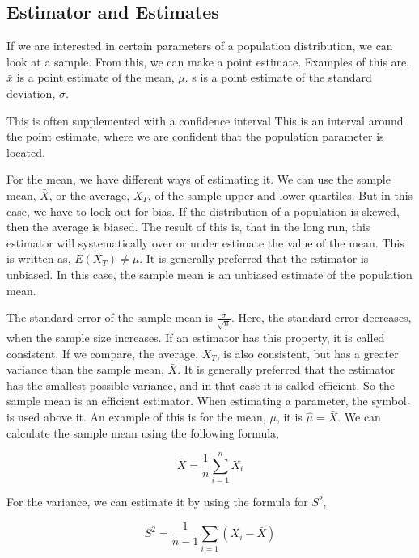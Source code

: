 \subsection{Estimator and Estimates}
If we are interested in certain parameters of a population distribution, we can look at a sample. From this, we can make a point estimate. 
\newline
Examples of this are, 
\newline
$\bar{x}$ is a point estimate of the mean, $\mu$.
\newline
s is a point estimate of the standard deviation, $\sigma$.
\newline

\noindent This is often supplemented with a confidence interval
\newline
This is an interval around the point estimate, where we are confident that the population parameter is located.
\newline

\noindent For the mean, we have different ways of estimating it. We can use the sample mean, $\bar{X}$, or the average, $X_T$, of the sample upper and lower quartiles. 
But in this case, we have to look out for bias. If the distribution of a population is skewed, then the average is biased. The result of this is, that in the long run, this estimator will systematically over or under estimate the value of the mean. This is written as,
\newline
$E(X_T) \neq \mu$.
\newline
It is generally preferred that the estimator is unbiased. In this case, the sample mean is an unbiased estimate of the population mean.
\newline

\noindent The standard error of the sample mean is $\frac{\sigma}{\sqrt{n}}$. Here, the standard error decreases, when the sample size increases. If an estimator has this property, it is called consistent. If we compare, the average, $X_T$, is also consistent, but has a greater variance than the sample mean, $\bar{X}$. 
\newline
It is generally preferred that the estimator has the smallest possible variance, and in that case it is called efficient. So the sample mean is an efficient estimator.
\newline
When estimating a parameter, the symbol $\hat{}$ is used above it. An example of this is for the mean, $\mu$, it is $\hat{\mu} = \bar{X}$.
\newline
We can calculate the sample mean using the following formula,

\begin{equation}
	\bar{X}=\frac{1}{n} \sum_{i=1}^{n}X_i
\end{equation}


\noindent For the variance, we can estimate it by using the formula for $S^2$,

\begin{equation}
	S^2=\frac{1}{n-1} \sum_{i=1}(X_i-\bar{X})
\end{equation}
